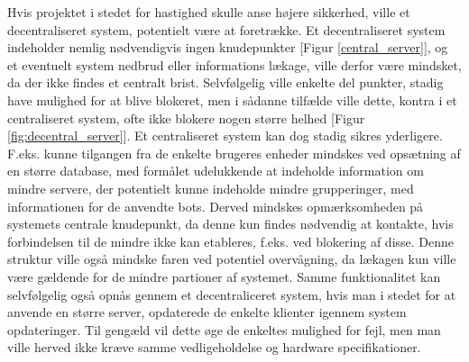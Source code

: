 Hvis projektet i stedet for hastighed skulle anse højere sikkerhed, ville et decentraliseret system, potentielt være at foretrække. 
Et decentraliseret system indeholder nemlig nødvendigvis ingen knudepunkter [Figur \ref{central_server}], og et eventuelt system nedbrud eller informations lækage, ville derfor være mindsket, da der ikke findes et centralt brist.
Selvfølgelig ville enkelte del punkter, stadig have mulighed for at blive blokeret, men i sådanne tilfælde ville dette, kontra i et centraliseret system, ofte ikke blokere nogen større helhed [Figur \ref{fig:decentral_server}].
Et centraliseret system kan dog stadig sikres yderligere. F.eks. kunne tilgangen fra de enkelte brugeres enheder mindskes ved opsætning af en større database, med formålet udelukkende at indeholde information om mindre servere, der potentielt kunne indeholde mindre grupperinger, med informationen for de anvendte bots. Derved mindskes opmærksomheden på systemets centrale knudepunkt, da denne kun findes nødvendig at kontakte, hvis forbindelsen til de mindre ikke kan etableres, f.eks. ved blokering af disse. Denne struktur ville også mindske faren ved potentiel overvågning, da lækagen kun ville være gældende for de mindre partioner af systemet.
Samme funktionalitet kan selvfølgelig også opnås gennem et decentraliceret system, hvis man i stedet for at anvende en større server, opdaterede de enkelte klienter igennem system opdateringer. Til gengæld vil dette øge de enkeltes mulighed for fejl, men man ville herved ikke kræve samme vedligeholdelse og hardware specifikationer.






